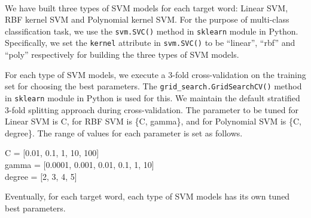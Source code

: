 \\We have built three types of SVM models for each target word: Linear SVM, RBF kernel SVM and Polynomial kernel SVM. For the purpose of multi-class classification task, we use the \texttt{svm.SVC()} method in \texttt{sklearn} module in Python. Specifically, we set the \texttt{kernel} attribute in \texttt{svm.SVC()} to be ``linear'', ``rbf'' and ``poly'' respectively for building the three types of SVM models.

For each type of SVM models, we execute a 3-fold cross-validation on the training set for choosing the best parameters. The \texttt{grid\_search.GridSearchCV()} method in \texttt{sklearn} module in Python is used for this. We maintain the default stratified 3-fold splitting approach during cross-validation. The parameter to be tuned for Linear SVM is C, for RBF SVM is \{C, gamma\}, and for Polynomial SVM is \{C, degree\}. The range of values for each parameter is set as follows.

C = [0.01, 0.1, 1, 10, 100] \\
gamma = [0.0001, 0.001, 0.01, 0.1, 1, 10] \\
degree = [2, 3, 4, 5]

Eventually, for each target word, each type of SVM models has its own tuned best parameters.

